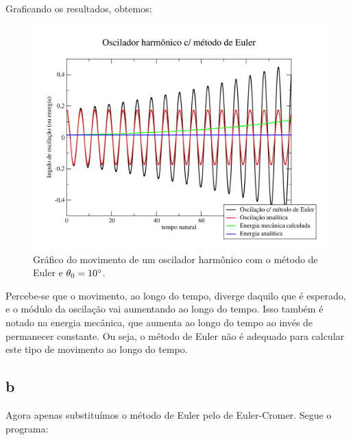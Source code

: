 \documentclass[12pt,a4paper]{article}
\begin{document}
Graficando os resultados, obtemos:
\begin{figure}[H]
\centering
\includegraphics[width=\linewidth]{../tarefa-1a/grafico.png}
\caption{Gráfico do movimento de um oscilador harmônico com o método de Euler e $\theta_0 = 10\degree$.}
\end{figure}

Percebe-se que o movimento, ao longo do tempo, diverge daquilo que é esperado, e o módulo da oscilação vai aumentando ao longo do tempo. Isso também é notado na energia mecânica, que aumenta ao longo do tempo ao invés de permanecer constante. Ou seja, o método de Euler não é adequado para calcular este tipo de movimento ao longo do tempo.

\subsection{b}

Agora apenas substituímos o método de Euler pelo de Euler-Cromer. Segue o programa:
\end{document}
